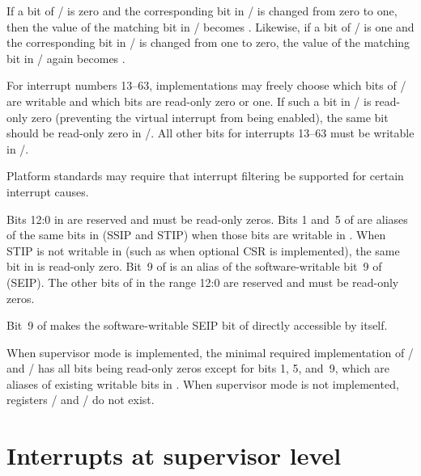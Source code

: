If a bit of / is zero and the corresponding bit
in / is changed from zero to one, then the value
of the matching bit in / becomes {\unspecified}.
Likewise, if a bit of / is one and the corresponding
bit in / is changed from one to zero, the value
of the matching bit in / again becomes {\unspecified}.

For interrupt numbers 13--63, implementations may freely choose which
bits of / are writable and which bits are read-only
zero or one.
If such a bit in / is read-only zero (preventing the
virtual interrupt from being enabled), the same bit should be read-only
zero in /.
All other bits for interrupts 13--63 must be writable in
/.

\begin{commentary}
Platform standards may require that interrupt filtering be supported
for certain interrupt causes.
\end{commentary}

Bits 12:0 in  are reserved and must be read-only zeros.
Bits 1 and~5 of  are aliases of the same bits in 
(SSIP and STIP) when those bits are writable in .
When STIP is not writable in  (such as when optional
CSR  is implemented), the
same bit in  is read-only zero.
Bit~9 of  is an alias of the software-writable bit~9 of 
(SEIP).
The other bits of  in the range 12:0 are reserved and must be
read-only zeros.

\begin{commentary}
Bit~9 of\/  makes the software-writable SEIP bit of\/ 
directly accessible by itself.
\end{commentary}

When supervisor mode is implemented, the minimal required
implementation of / and / has all
bits being read-only zeros except for  bits 1, 5, and~9, which
are aliases of existing writable bits in .
When supervisor mode is not implemented, registers /
and / do not exist.


\section{Interrupts at supervisor level}
\label{sec:intrs-S}

